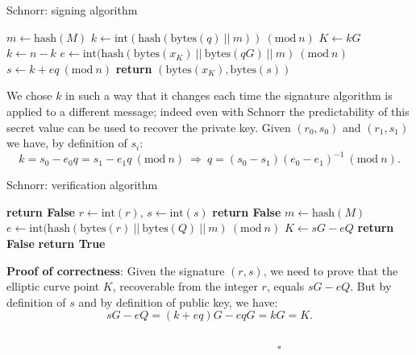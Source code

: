 \begin{algorithm}
	\caption{Schnorr: signing algorithm}
	\label{alg:schnorr_sig}
	\begin{algorithmic}[1]
		\State $m \gets \text{hash}(M)$
		\State $k \gets \text{int}(\text{hash}(\text{bytes}(q) \ || \ m)) \ (\text{mod} \ n)$
		\State $K \gets kG$
		\State $k \gets n - k$
		\EndIf
		\State $e \gets \text{int}(\text{hash}(\text{bytes}(x_K) \ || \ \text{bytes}(qG) \ || \ m) \ (\text{mod} \ n)$
		\State $s \gets k + eq \ (\text{mod} \ n)$
		\State \textbf{return} $(\text{bytes}(x_K), \text{bytes}(s))$
		\EndProcedure
	\end{algorithmic}
\end{algorithm}

\noindent
We chose $k$ in such a way that it changes each time the signature algorithm is applied to a different message; indeed even with Schnorr the predictability of this secret value can be used to recover the private key. Given $(r_0, s_0)$ and $(r_1, s_1)$ we have, by definition of $s_i$:
$$k = s_0 - e_0q = s_1 - e_1q\ (\text{mod} \ n) \ \Longrightarrow \ q = (s_0 - s_1)(e_0 - e_1)^{-1} \ (\text{mod} \ n).$$

\bigskip

\begin{algorithm}
	\caption{Schnorr: verification algorithm}
	\label{alg:schnorr_ver}
	\begin{algorithmic}[1]
		\State \textbf{return False}
		\EndIf 
		\State $r \gets \text{int}(r)$, $s \gets \text{int}(s)$
		\State \textbf{return False}
		\EndIf
		\State $m \gets \text{hash}(M)$
		\State $e \gets \text{int}(\text{hash}(\text{bytes}(r) \ || \ \text{bytes}(Q) \ || \ m) \ (\text{mod} \ n)$
		\State $K \gets sG - eQ$
		\State \textbf{return False} 
		\EndIf
		\State \textbf{return True}
		\EndProcedure	
	\end{algorithmic}
\end{algorithm}

\bigskip
\noindent
{\bf Proof of correctness}: Given the signature $(r, s)$, we need to prove that the elliptic curve point $K$, recoverable from the integer $r$, equals $sG - eQ$. But by definition of $s$ and by definition of public key, we have:
$$sG - eQ = (k + eq)G - eqG = kG = K.$$ 
\ \ \ \ \ \ \ \ \ \ \ \ \ \ \ \ \ \ \ \ \ \ \ \ \ \ \ \ \ \ \ \ \ \ \ \ \ \ \ \ \ \ \ \ \ \ \ \ \ \ \ \ \ \ \ \ \ \ \ \ \ \ \ \ \ \ \ \ \ \ \ \ \ \ \ \ \ \ \ \ \ \ \ \ \ \ \ \ \ \ \ \ \ \ \ \ \ \ \ \ \ \ \ \ \ \ \ \ \ \ \ \ \ \ \ \ \ \ \ \ $\square$

